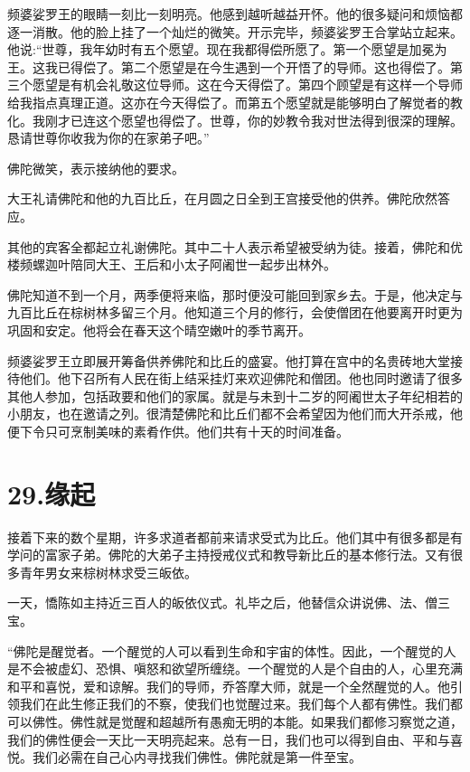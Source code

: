 \documentclass[12pt,twoside,openany]{book}
\begin{document}
频婆娑罗王的眼睛一刻比一刻明亮。他感到越听越益开怀。他的很多疑问和烦恼都逐一消散。他的脸上挂了一个灿烂的微笑。开示完毕，频婆娑罗王合掌站立起来。他说:“世尊，我年幼时有五个愿望。现在我都得偿所愿了。第一个愿望是加冕为王。这我已得偿了。第二个愿望是在今生遇到一个开悟了的导师。这也得偿了。第三个愿望是有机会礼敬这位导师。这在今天得偿了。第四个顾望是有这样一个导师给我指点真理正道。这亦在今天得偿了。而第五个愿望就是能够明白了解觉者的教化。我刚才已连这个愿望也得偿了。世尊，你的妙教令我对世法得到很深的理解。恳请世尊你收我为你的在家弟子吧。”

佛陀微笑，表示接纳他的要求。

大王礼请佛陀和他的九百比丘，在月圆之日全到王宫接受他的供养。佛陀欣然答应。

其他的宾客全都起立礼谢佛陀。其中二十人表示希望被受纳为徒。接着，佛陀和优楼频螺迦叶陪同大王、王后和小太子阿阇世一起步出林外。

佛陀知道不到一个月，两季便将来临，那时便没可能回到家乡去。于是，他决定与九百比丘在棕树林多留三个月。他知道三个月的修行，会使僧团在他要离开时更为巩固和安定。他将会在春天这个晴空嫩叶的季节离开。

频婆娑罗王立即展开筹备供养佛陀和比丘的盛宴。他打算在宫中的名贵砖地大堂接待他们。他下召所有人民在街上结采挂灯来欢迎佛陀和僧团。他也同时邀请了很多其他人参加，包括政要和他们的家属。就是与未到十二岁的阿阇世太子年纪相若的小朋友，也在邀请之列。很清楚佛陀和比丘们都不会希望因为他们而大开杀戒，他便下令只可烹制美味的素肴作供。他们共有十天的时间准备。


\chapter{29.缘起}\label{ch29}

接着下来的数个星期，许多求道者都前来请求受式为比丘。他们其中有很多都是有学问的富家子弟。佛陀的大弟子主持授戒仪式和教导新比丘的基本修行法。又有很多青年男女来棕树林求受三皈依。

一天，憍陈如主持近三百人的皈依仪式。礼毕之后，他替信众讲说佛、法、僧三宝。

“佛陀是醒觉者。一个醒觉的人可以看到生命和宇宙的体性。因此，一个醒觉的人是不会被虚幻、恐惧、嗔怒和欲望所缠绕。一个醒觉的人是个自由的人，心里充满和平和喜悦，爱和谅解。我们的导师，乔答摩大师，就是一个全然醒觉的人。他引领我们在此生修正我们的不察，使我们也觉醒过来。我们每个人都有佛性。我们都可以佛性。佛性就是觉醒和超越所有愚痴无明的本能。如果我们都修习察觉之道，我们的佛性便会一天比一天明亮起来。总有一日，我们也可以得到自由、平和与喜悦。我们必需在自己心内寻找我们佛性。佛陀就是第一件至宝。
\end{document}

